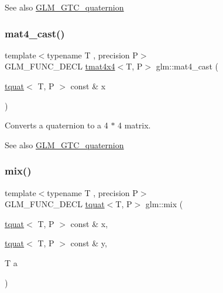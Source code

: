 \begin{DoxySeeAlso}{See also}
\hyperlink{group__gtc__quaternion}{G\+L\+M\+\_\+\+G\+T\+C\+\_\+quaternion} 
\end{DoxySeeAlso}
\mbox{\label{group__gtc__quaternion_ga14bb2ddf028c91542763eb6f2bba47ef}} 
\subsubsection{\texorpdfstring{mat4\+\_\+cast()}{mat4\_cast()}}
{\footnotesize\ttfamily template$<$typename T , precision P$>$ \\
G\+L\+M\+\_\+\+F\+U\+N\+C\+\_\+\+D\+E\+CL \hyperlink{structglm_1_1tmat4x4}{tmat4x4}$<$T, P$>$ glm\+::mat4\+\_\+cast (\begin{DoxyParamCaption}\item[{\hyperlink{structglm_1_1tquat}{tquat}$<$ T, P $>$ const \&}]{x }\end{DoxyParamCaption})}

Converts a quaternion to a 4 $\ast$ 4 matrix.

\begin{DoxySeeAlso}{See also}
\hyperlink{group__gtc__quaternion}{G\+L\+M\+\_\+\+G\+T\+C\+\_\+quaternion} 
\end{DoxySeeAlso}
\mbox{\label{group__gtc__quaternion_ga31cc82178742c36450f5662bd4fb30b0}} 
\subsubsection{\texorpdfstring{mix()}{mix()}}
{\footnotesize\ttfamily template$<$typename T , precision P$>$ \\
G\+L\+M\+\_\+\+F\+U\+N\+C\+\_\+\+D\+E\+CL \hyperlink{structglm_1_1tquat}{tquat}$<$T, P$>$ glm\+::mix (\begin{DoxyParamCaption}\item[{\hyperlink{structglm_1_1tquat}{tquat}$<$ T, P $>$ const \&}]{x,  }\item[{\hyperlink{structglm_1_1tquat}{tquat}$<$ T, P $>$ const \&}]{y,  }\item[{T}]{a }\end{DoxyParamCaption})}

